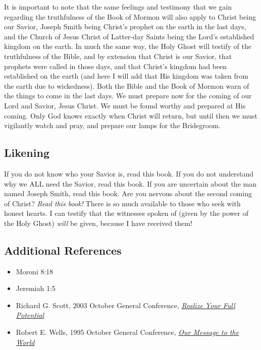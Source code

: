 \documentclass[12pt]{report}
\begin{document}
It is important to note that the same feelings and testimony that we gain regarding the truthfulness of the Book of Mormon will also apply to Christ being our Savior, Joseph Smith being Christ's prophet on the earth in the last days, and the Church of Jesus Christ of Latter-day Saints being the Lord's established kingdom on the earth.  In much the same way, the Holy Ghost will testify of the truthfulness of the Bible, and by extension that Christ is our Savior, that prophets were called in those days, and that Christ's kingdom had been established on the earth (and here I will add that His kingdom was taken from the earth due to wickedness).  Both the Bible and the Book of Mormon warn of the things to come in the last days.  We must prepare now for the coming of our Lord and Savior, Jesus Christ.  We must be found worthy and prepared at His coming.  Only God knows exactly when Christ will return, but until then we must vigilantly watch and pray, and prepare our lamps for the Bridegroom.

\subsection{Likening\label{intro:likening9}}
If you do not know who your Savior is, read this book.  If you do not understand why we ALL need the Savior, read this book.  If you are uncertain about the man named Joseph Smith, read this book.  Are you nervous about the second coming of Christ?  \emph{Read this book!} There is so much available to those who seek with honest hearts.  I can testify that the witnesses spoken of (given by the power of the Holy Ghost) \emph{will} be given, because I have received them!

\subsection{Additional References\label{intro:references9}}
\begin{itemize}
\item Moroni 8:18
\item Jeremiah 1:5
\item Richard G. Scott, 2003 October General Conference, \href{https://www.lds.org/general-conference/2003/10/realize-your-full-potential?lang=eng}{\emph{Realize Your Full Potential}}
\item Robert E. Wells, 1995 October General Conference, \href{https://www.lds.org/general-conference/1995/10/our-message-to-the-world?lang=eng}{\emph{Our Message to the World}}
\end{itemize}
\end{document}
